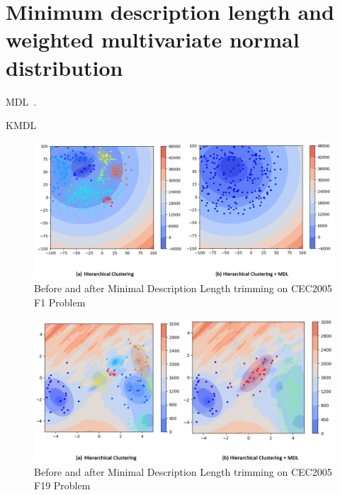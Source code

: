 \section{Minimum description length and weighted multivariate normal distribution}

MDL~\cite{Rissanen:1984:Universal}.

KMDL~\cite{Kyrgyzov:2007:KMDL}

\begin{figure}
\centering
\includegraphics[width=\textwidth]{MDL_comparison}
\caption{Before and after Minimal Description Length trimming on CEC2005 F1 Problem}\label{fig:MDL_comparison}
\end{figure}

\begin{figure}
\centering
\includegraphics[width=\textwidth]{MDL_comparison_F19}
\caption{Before and after Minimal Description Length trimming on CEC2005 F19 Problem}\label{fig:MDL_comparison_F19}
\end{figure}






